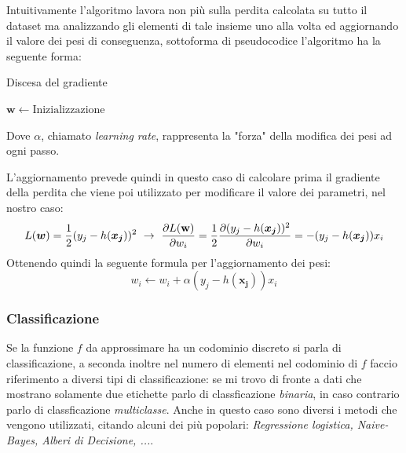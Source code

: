 \documentclass[../../main.tex]{subfiles}
\begin{document}
    Intuitivamente l'algoritmo lavora non più sulla perdita calcolata su tutto il dataset ma analizzando gli elementi di tale insieme uno alla volta ed aggiornando il valore dei pesi di conseguenza, sottoforma di pseudocodice l'algoritmo ha la seguente forma:

    \begin{algorithm}
        \caption{Discesa del gradiente}\label{alg:gradient_desc}
        \begin{algorithmic}
            \State $\boldsymbol{w} \gets \text{Inizializzazione}$
            \EndFor
            \EndWhile
        \end{algorithmic}
    \end{algorithm}

    Dove $\alpha$, chiamato \textit{learning rate}, rappresenta la "forza" della modifica dei pesi ad ogni passo.

    L'aggiornamento prevede quindi in questo caso di calcolare prima il gradiente della perdita che viene poi utilizzato per modificare il valore dei parametri, nel nostro caso:
    \[L(\boldsymbol{w}) = \frac{1}{2}(y_j - h(\boldsymbol{x_j}))^2 \ \rightarrow \ \frac{\partial L(\bf{w})}{\partial w_i} = \frac{1}{2}\frac{\partial(y_j - h(\boldsymbol{x_j}))^2}{\partial w_i} = - (y_j - h(\boldsymbol{x_j})) x_i\]
    Ottenendo quindi la seguente formula per l'aggiornamento dei pesi:
    \begin{equation}
        w_i \leftarrow w_i + \alpha (y_j - h(\boldsymbol{x_j})) x_i
    \end{equation}   

    \subsubsection{Classificazione} 
    

    Se la funzione $f$ da approssimare ha un codominio discreto si parla di classificazione, a seconda inoltre nel numero di elementi nel codominio di $f$ faccio riferimento a diversi tipi di classificazione: se mi trovo di fronte a dati che mostrano solamente due etichette parlo di classficazione \textit{binaria}, in caso contrario parlo di classficazione \textit{multiclasse}. Anche in questo caso sono diversi i metodi che vengono utilizzati, citando alcuni dei più popolari: \textit{Regressione logistica, Naive-Bayes, Alberi di Decisione, ...}.
    
\end{document}
